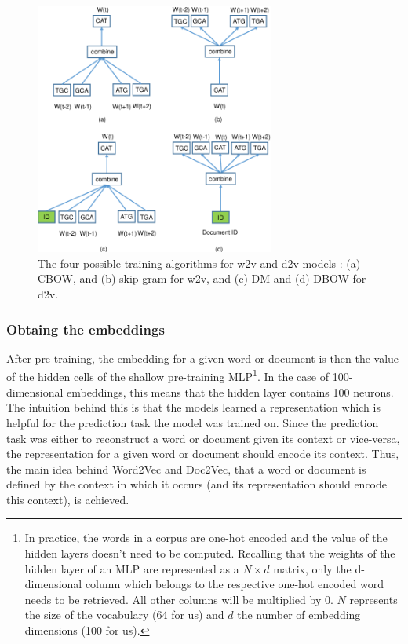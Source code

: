 \begin{figure}
	\centering\includegraphics[width=0.7\textwidth]{../visualizations/ch4-methods/w2v_d2v_training_variants.png} 
	\caption{
		The four possible training algorithms for w2v and d2v models \cite{d2vsplicing}: (a) CBOW, and (b) skip-gram for w2v, and (c) DM and (d) DBOW for d2v. 
	}
	\label{fig:w2vd2vtrainingvariants}
\end{figure}

\subsubsection{Obtaing the embeddings}
After pre-training, the embedding for a given word or document is then the value of the hidden cells of the shallow pre-training MLP\footnote{In practice, the words in a corpus are one-hot encoded and the value of the hidden layers doesn't need to be computed. Recalling that the weights of the hidden layer of an MLP are represented as a $N\times d$ matrix, only the d-dimensional column which belongs to the respective one-hot encoded word needs to be retrieved. All other columns will be multiplied by 0. $N$ represents the size of the vocabulary (64 for us) and $d$ the number of embedding dimensions (100 for us).}. In the case of 100-dimensional embeddings, this means that the hidden layer contains 100 neurons. The intuition behind this is that the models learned a representation which is helpful for the prediction task the model was trained on. Since the prediction task was either to reconstruct a word or document given its context or vice-versa, the representation for a given word or document should encode its context. Thus, the main idea behind Word2Vec and Doc2Vec, that a word or document is defined by the context in which it occurs (and its representation should encode this context), is achieved.



